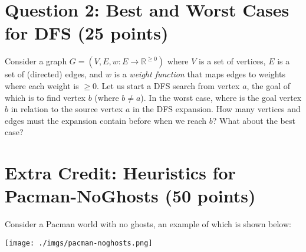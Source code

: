 \documentclass[11pt]{article}
\newcommand{\question}[1]{\section*{\normalsize #1}}
\begin{document}
\question{Question 2: Best and Worst Cases for DFS (25 points)}
Consider a graph $G = (V, E, w: E\rightarrow \mathbb{R}^{\ge 0})$ where $V$ is a set of vertices, $E$ is a set of (directed) edges, and $w$ is a \textit{weight function} that maps edges to weights where each weight is $\ge 0$. Let us start a DFS search from vertex $a$, the goal of which is to find vertex $b$ (where $b\neq a$). In the worst case, where is the goal vertex $b$ in relation to the source vertex $a$ in the DFS expansion. How many vertices and edges must the expansion contain before when we reach $b$? What about the best case?\newpage


\question{Extra Credit: Heuristics for Pacman-NoGhosts (50 points)}
Consider a Pacman world with no ghosts, an example of which is shown below:

\texttt{[image: ./imgs/pacman-noghosts.png]}
\end{document}

